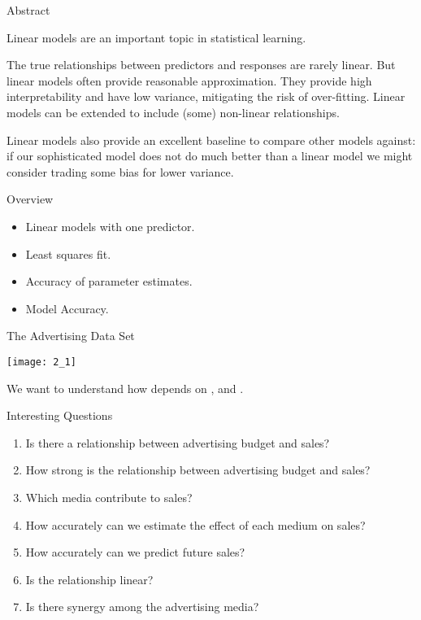 \documentclass[mathserif, aspectratio=169]{beamer}
\subtitle{\bfseries%
  {Linear Regression, Part 1}\\%
  {\tiny\it linear models, least square fit, simple linear regression, parameter \& model accuracy}\\%
}
\begin{document}


\begin{frame}{Abstract}

	\begin{blurb}
		Linear models are an important topic in statistical learning.  

		The true relationships between predictors and responses are rarely linear.
		But linear models often provide reasonable approximation. They provide
		high interpretability and have low variance, mitigating the risk of over-fitting.
		Linear models can be extended to include (some) non-linear relationships. 

		Linear models also provide an excellent baseline to compare other models against: if 
		our sophisticated model does not do much better than a linear model we might consider
		trading some bias for lower variance.
	\end{blurb}
\end{frame}

\begin{frame}{Overview}
	\begin{itemize}
		\item Linear models with one predictor.
		\item Least squares fit.
		\item Accuracy of parameter estimates.
		\item Model Accuracy.
	\end{itemize}
\end{frame}

\begin{frame}{The Advertising Data Set}
	\begin{center}
		\texttt{[image: 2\_1]}

		We want to understand how  depends on ,  and .
	\end{center}
\end{frame}

\begin{frame}{Interesting Questions}
	\begin{enumerate}
		\item Is there a relationship between advertising budget and sales?
		\item How strong is the relationship between advertising budget and sales?
		\item Which media contribute to sales?
		\item How accurately can we estimate the effect of each medium on sales?
		\item How accurately can we predict future sales?
		\item Is the relationship linear?
		\item Is there synergy among the advertising media?
	\end{enumerate}
\end{frame}
\end{document}
